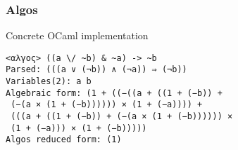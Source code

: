 \documentclass{beamer}
\begin{document}
\begin{frame}
\frametitle{}
\begin{block}
{}

\end{block}
\end{frame}

\begin{frame}
\frametitle{}
\begin{block}
{}

\end{block}
\end{frame}

\begin{frame}
\frametitle{}
\begin{block}
{}

\end{block}
\end{frame}

\begin{frame}
\frametitle{}
\begin{block}
{}

\end{block}
\end{frame}

\begin{frame}
\frametitle{}
\begin{block}
{}

\end{block}
\end{frame}

\begin{frame}
\frametitle{}
\begin{block}
{}

\end{block}
\end{frame}

\begin{frame}[fragile]
\frametitle{Algos}
\begin{block}
{Concrete OCaml implementation}


\begin{center}
\begin{verbatim}
<αλγος> ((a \/ ~b) & ~a) -> ~b
Parsed: (((a ∨ (¬b)) ∧ (¬a)) ⇒ (¬b))
Variables(2): a b
Algebraic form: (1 + ((−((a + ((1 + (−b)) +
 (−(a × (1 + (−b)))))) × (1 + (−a)))) +
 (((a + ((1 + (−b)) + (−(a × (1 + (−b)))))) ×
 (1 + (−a))) × (1 + (−b)))))
Algos reduced form: (1)
\end{verbatim}
\end{center}


\end{block}
\end{frame}
\end{document}
